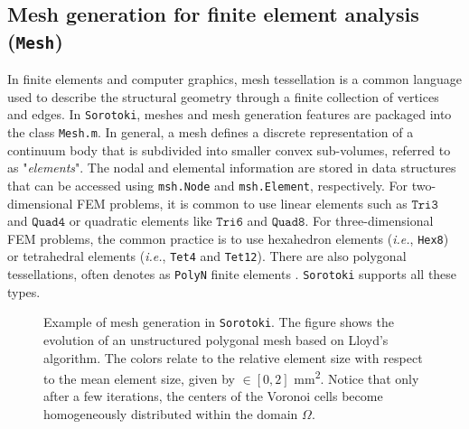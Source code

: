 \subsection{Mesh generation for finite element analysis (\texttt{Mesh})}
\label{sec:C5:mesh}
In finite elements and computer graphics, mesh tessellation is a common language used to describe the structural geometry through a finite collection of vertices and edges. In \texttt{Sorotoki}, meshes and mesh generation features are packaged into the class \texttt{Mesh.m}. In general, a mesh defines a discrete representation of a continuum body that is subdivided into smaller convex sub-volumes, referred to as "\textit{elements}". The nodal and elemental information are stored in data structures that can be accessed using \texttt{msh.Node} and \texttt{msh.Element}, respectively. For two-dimensional FEM problems, it is common to use linear elements such as $\texttt{Tri3}$ and $\texttt{Quad4}$ or quadratic elements like $\texttt{Tri6}$ and $\texttt{Quad8}$. For three-dimensional FEM problems, the common practice is to use hexahedron elements (\textit{i.e.}, \texttt{Hex8}) or tetrahedral elements (\textit{i.e.}, \texttt{Tet4} and \texttt{Tet12}). There are also polygonal tessellations, often denotes as \texttt{PolyN} finite elements \cite{Talischi2012Mar}. \texttt{Sorotoki} supports all these types. \vspace{1mm}
%
\begin{figure}[!t]
    \centering
    \vspace{-3mm}
    \caption{Example of mesh generation in \texttt{Sorotoki}. The figure shows the evolution of an unstructured polygonal mesh based on Lloyd's algorithm. The colors relate to the relative element size with respect to the mean element size, given by \protect{}$\!\!\in [0,2]$ \si{\milli \meter \squared}. Notice that only after a few iterations, the centers of the Voronoi cells become homogeneously distributed within the domain $\Omega$.}
    \label{fig:sorotoki:meshexample}
    \vspace{-3mm}
\end{figure}

